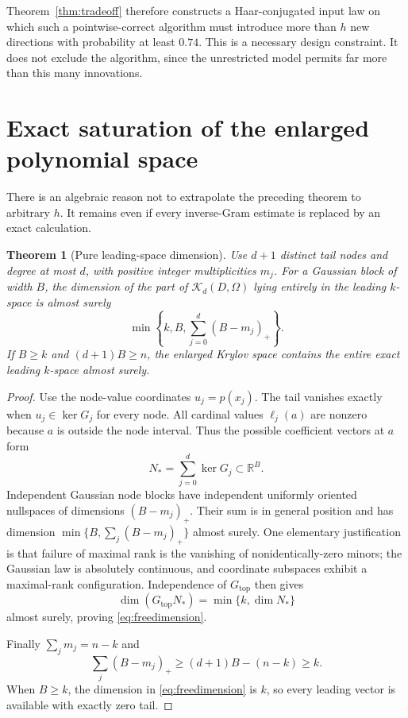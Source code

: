 \documentclass[11pt]{article}
\newtheorem{theorem}{Theorem}[section]
\theoremstyle{definition}
\newcommand{\R}{\mathbb R}
\newcommand{\K}{\mathcal K}
\begin{document}
Theorem~\ref{thm:tradeoff} therefore constructs a Haar-conjugated input law on which such a pointwise-correct algorithm must introduce more than $h$ new directions with probability at least $0.74$. This is a necessary design constraint. It does not exclude the algorithm, since the unrestricted model permits far more than this many innovations.

\section{Exact saturation of the enlarged polynomial space}\label{sec:saturation}
There is an algebraic reason not to extrapolate the preceding theorem to arbitrary $h$. It remains even if every inverse-Gram estimate is replaced by an exact calculation.

\begin{theorem}[Pure leading-space dimension]\label{thm:saturation}
Use $d+1$ distinct tail nodes and degree at most $d$, with positive integer multiplicities $m_j$. For a Gaussian block of width $B$, the dimension of the part of $\K_d(D,\Omega)$ lying entirely in the leading $k$-space is almost surely
\begin{equation}\label{eq:freedimension}
 \min\left\{k,B,\sum_{j=0}^d(B-m_j)_+\right\}.
\end{equation}
If $B\ge k$ and $(d+1)B\ge n$, the enlarged Krylov space contains the entire exact leading $k$-space almost surely.
\end{theorem}
\begin{proof}
Use the node-value coordinates $u_j=p(x_j)$. The tail vanishes exactly when $u_j\in\ker G_j$ for every node. All cardinal values $\ell_j(a)$ are nonzero because $a$ is outside the node interval. Thus the possible coefficient vectors at $a$ form
\[
 N_* =\sum_{j=0}^d\ker G_j\subset\R^B.
\]
Independent Gaussian node blocks have independent uniformly oriented nullspaces of dimensions $(B-m_j)_+$. Their sum is in general position and has dimension $\min\{B,\sum_j(B-m_j)_+\}$ almost surely. One elementary justification is that failure of maximal rank is the vanishing of nonidentically-zero minors; the Gaussian law is absolutely continuous, and coordinate subspaces exhibit a maximal-rank configuration. Independence of $G_{\mathrm{top}}$ then gives
\[
 \dim(G_{\mathrm{top}}N_*)=\min\{k,\dim N_*\}
\]
almost surely, proving \eqref{eq:freedimension}.

Finally $\sum_jm_j=n-k$ and
\[
 \sum_j(B-m_j)_+\ge(d+1)B-(n-k)\ge k.
\]
When $B\ge k$, the dimension in \eqref{eq:freedimension} is $k$, so every leading vector is available with exactly zero tail.
\end{proof}
\end{document}
